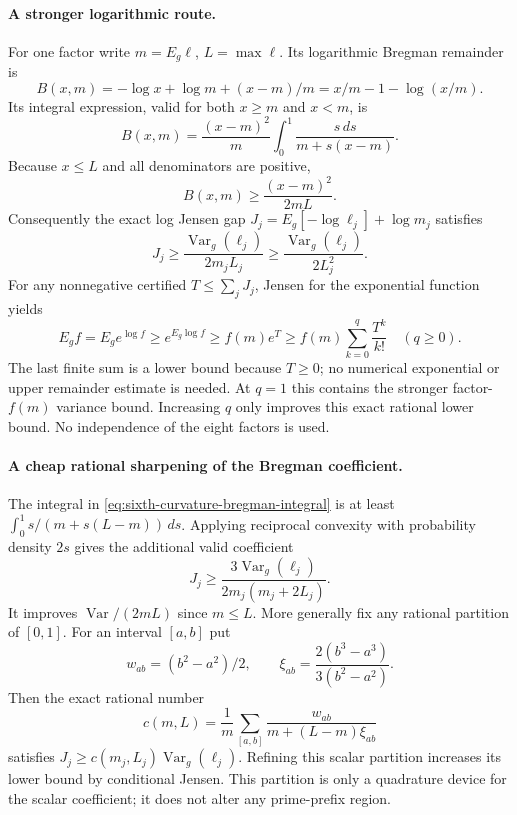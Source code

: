 \paragraph{A stronger logarithmic route.}
For one factor write $m=E_g\ell$, $L=\max\ell$. Its logarithmic
Bregman remainder is
\[
 B(x,m)=-\log x+\log m+(x-m)/m
       =x/m-1-\log(x/m).
\]
Its integral expression, valid for both $x\ge m$ and $x<m$, is
\begin{equation}\label{eq:sixth-curvature-bregman-integral}
 B(x,m)=\frac{(x-m)^2}{m}
             \int_0^1\frac{s\,ds}{m+s(x-m)}.
\end{equation}
Because $x\le L$ and all denominators are positive,
\[
 B(x,m)\ge\frac{(x-m)^2}{2mL}.
\]
Consequently the exact log Jensen gap
$J_j=E_g[-\log\ell_j]+\log m_j$ satisfies
\[
 J_j\ge\frac{\operatorname{Var}_g(\ell_j)}{2m_jL_j}
 \ge\frac{\operatorname{Var}_g(\ell_j)}{2L_j^2}.
\]
For any nonnegative certified $T\le\sum_jJ_j$, Jensen for the
exponential function yields
\begin{equation}\label{eq:sixth-curvature-exponential}
 E_g f=E_g e^{\log f}\ge e^{E_g\log f}
 \ge f(m)e^T
 \ge f(m)\sum_{k=0}^{q}\frac{T^k}{k!}\quad(q\ge0).
\end{equation}
The last finite sum is a lower bound because $T\ge0$; no numerical
exponential or upper remainder estimate is needed. At $q=1$ this
contains the stronger factor-$f(m)$ variance bound. Increasing $q$
only improves this exact rational lower bound. No independence of
the eight factors is used.

\paragraph{A cheap rational sharpening of the Bregman coefficient.}
The integral in \eqref{eq:sixth-curvature-bregman-integral} is at least
$\int_0^1s/(m+s(L-m))\,ds$. Applying reciprocal convexity with
probability density $2s$ gives the additional valid coefficient
\[
 J_j\ge\frac{3\operatorname{Var}_g(\ell_j)}
                     {2m_j(m_j+2L_j)}.
\]
It improves $\operatorname{Var}/(2mL)$ since $m\le L$.
More generally fix any rational partition of $[0,1]$. For an interval
$[a,b]$ put
\[
 w_{ab}=(b^2-a^2)/2,
 \qquad \xi_{ab}=\frac{2(b^3-a^3)}{3(b^2-a^2)}.
\]
Then the exact rational number
\[
 c(m,L)=\frac1m\sum_{[a,b]}
             \frac{w_{ab}}{m+(L-m)\xi_{ab}}
\]
satisfies $J_j\ge c(m_j,L_j)\operatorname{Var}_g(\ell_j)$.
Refining this scalar partition increases its lower bound by
conditional Jensen. This partition is only a quadrature device for
the scalar coefficient; it does not alter any prime-prefix region.

